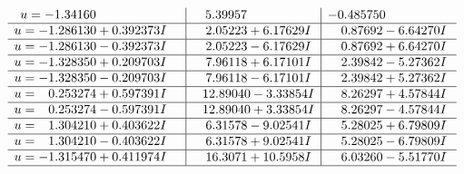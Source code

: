 \documentclass[1p]{elsarticle_modified}
\theoremstyle{definition}
\begin{document}
$$\begin{array}{c|c|c}
\begin{aligned}
u &= -1.34160\phantom{ +0.000000I}\end{aligned}
 & \phantom{-}5.39957\phantom{ +0.000000I} & -0.485750\phantom{ +0.000000I} \\ \hline\begin{aligned}
u &= -1.286130 + 0.392373 I\end{aligned}
 & \phantom{-}2.05223 + 6.17629 I & \phantom{-}0.87692 - 6.64270 I \\ \hline\begin{aligned}
u &= -1.286130 - 0.392373 I\end{aligned}
 & \phantom{-}2.05223 - 6.17629 I & \phantom{-}0.87692 + 6.64270 I \\ \hline\begin{aligned}
u &= -1.328350 + 0.209703 I\end{aligned}
 & \phantom{-}7.96118 + 6.17101 I & \phantom{-}2.39842 - 5.27362 I \\ \hline\begin{aligned}
u &= -1.328350 - 0.209703 I\end{aligned}
 & \phantom{-}7.96118 - 6.17101 I & \phantom{-}2.39842 + 5.27362 I \\ \hline\begin{aligned}
u &= \phantom{-}0.253274 + 0.597391 I\end{aligned}
 & \phantom{-}12.89040 - 3.33854 I & \phantom{-}8.26297 + 4.57844 I \\ \hline\begin{aligned}
u &= \phantom{-}0.253274 - 0.597391 I\end{aligned}
 & \phantom{-}12.89040 + 3.33854 I & \phantom{-}8.26297 - 4.57844 I \\ \hline\begin{aligned}
u &= \phantom{-}1.304210 + 0.403622 I\end{aligned}
 & \phantom{-}6.31578 - 9.02541 I & \phantom{-}5.28025 + 6.79809 I \\ \hline\begin{aligned}
u &= \phantom{-}1.304210 - 0.403622 I\end{aligned}
 & \phantom{-}6.31578 + 9.02541 I & \phantom{-}5.28025 - 6.79809 I \\ \hline\begin{aligned}
u &= -1.315470 + 0.411974 I\end{aligned}
 & \phantom{-}16.3071 + 10.5958 I & \phantom{-}6.03260 - 5.51770 I\\
 \hline 
 \end{array}$$\newpage$$\begin{array}{c|c|c}  

\end{array}$$
\end{document}
